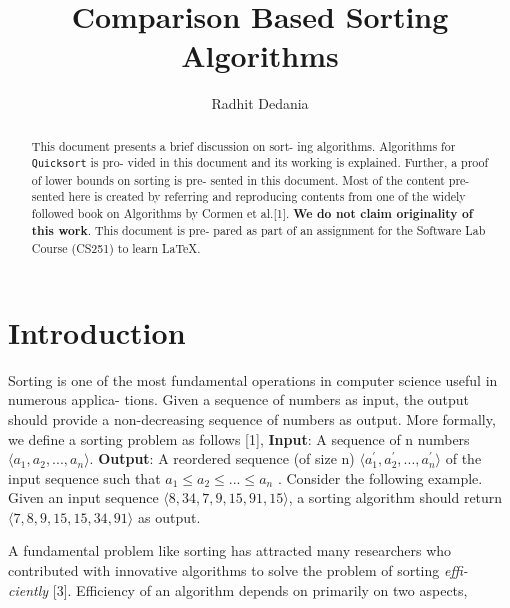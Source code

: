\documentclass[a4paper, 10pt,twocolumn]{article}
\title{Comparison Based Sorting Algorithms}
\author{Radhit Dedania}
\date{}
\begin{document}
\maketitle
\begin{abstract}
This document presents a brief discussion on sort-
ing algorithms. Algorithms for \texttt{Quicksort} is pro-
vided in this document and its working is explained.
Further, a proof of lower bounds on sorting is pre-
sented in this document. Most of the content pre-
sented here is created by referring and reproducing
contents from one of the widely followed book on
Algorithms by Cormen et al.[1]. \textbf{We do not claim
originality of this work}. This document is pre-
pared as part of an assignment for the Software Lab
Course (CS251) to learn \LaTeX.
\end{abstract}    
\begin{wrapfigure}%
\end{wrapfigure}\noindent
\section{Introduction}
Sorting is one of the most fundamental operations
in computer science useful in numerous applica-
tions. Given a sequence of numbers as input, the
output should provide a non-decreasing sequence
of numbers as output. More formally, we define a
sorting problem as follows [1],\newline
\textbf{Input}: A sequence of n numbers $\langle a_1 , a_2 , ..., a_n \rangle$.
\textbf{Output}: \hspace{10pt} A reordered sequence (of \hspace{5pt} size\hspace{5pt}  n)
$\langle a_1^{'} , a_2^{'} , ..., a_n^{'}\rangle$  of the input sequence such that $a_1 \leq
a_2 \leq ... \leq a_n$ .\newline
Consider the following example. Given an input
sequence $\langle8, 34, 7, 9, 15, 91, 15\rangle$, a sorting algorithm
should return $\langle7, 8, 9, 15, 15, 34, 91\rangle$ as output. \par
A fundamental problem like sorting has attracted
many researchers who contributed with innovative
algorithms to solve the problem of sorting \textit{effi-
ciently} [3]. Efficiency of an algorithm depends on
primarily on two aspects,\vspace{5pt} \noindent
\end{document}
